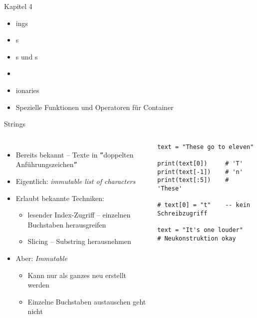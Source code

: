 
\begin{frame}[fragile]{Kapitel 4}
%
\begin{itemize}
\item {}ings
\item {}s
\item {}s und s
\item {}
\item {}ionaries
\item Spezielle Funktionen und Operatoren für Container
\end{itemize}
%
\end{frame}


\begin{frame}[fragile]{Strings}
%
\begin{columns}[T]
\begin{itemize}
\item Bereits bekannt -- Texte in \texttt{''}doppelten Anführungszeichen\texttt{''}
\item Eigentlich: \emph{immutable list of characters}
\item Erlaubt bekannte Techniken:
	\begin{itemize}
	\item lesender Index-Zugriff -- einzelnen Buchstaben herausgreifen
	\item Slicing -- Substring herausnehmen
	\end{itemize}
\item Aber: \emph{Immutable}
	\begin{itemize}
	\item Kann nur als ganzes neu erstellt werden
	\item Einzelne Buchstaben austauschen geht nicht
	\end{itemize}
\end{itemize}
%
\begin{codebox}
\begin{verbatim}
text = "These go to eleven"

print(text[0])     # 'T'
print(text[-1])    # 'n'
print(text[:5])    # 'These'

# text[0] = "t"    -- kein Schreibzugriff

text = "It's one louder" 
# Neukonstruktion okay
\end{verbatim}
\end{codebox}
\end{columns}
%
\end{frame}

